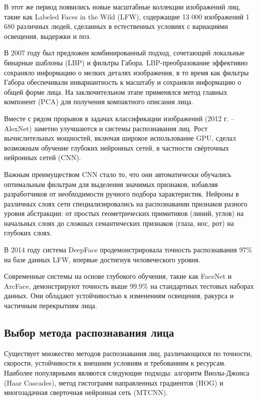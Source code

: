 В этот же период появились новые масштабные коллекции изображений лиц, такие как Labeled Faces in the Wild (LFW), содержащие 13 000 изображений 1 680 различных людей, сделанных в естественных условиях с вариациями освещения, выдержки и поз.

В 2007 году был предложен комбинированный подход, сочетающий локальные бинарные шаблоны (LBP) и фильтры Габора. LBP-преобразование эффективно сохраняло информацию о мелких деталях изображения, в то время как фильтры Габора обеспечивали инвариантность к масштабу и сохраняли информацию о общей форме лица. На заключительном этапе применялся метод главных компонент (PCA) для получения компактного описания лица.

Вместе с рядом прорывов в задачах классификации изображений (2012 г. –  AlexNet) заметно улучшаются и системы распознавания лиц. Рост вычислительных мощностей, включая широкое использование GPU, сделал возможным обучение глубоких нейронных сетей, в частности свёрточных нейронных сетей (CNN).

Важным преимуществом CNN стало то, что они автоматически обучались оптимальным фильтрам для выделения значимых признаков, избавляя разработчиков от необходимости ручного подбора характеристик. Нейроны в различных слоях сети специализировались на распознавании признаков разного уровня абстракции: от простых геометрических примитивов (линий, углов) на начальных слоях до сложных семантических признаков (глаза, нос, рот) на глубоких слоях.

В 2014 году система DeepFace продемонстрировала точность распознавания 97\% на базе данных LFW, впервые достигнув человеческого уровня.

Современные системы на основе глубокого обучения, такие как FaceNet и ArcFace, демонстрируют точность выше 99.9\% на стандартных тестовых наборах данных. Они обладают устойчивостью к изменениям освещения, ракурса и частичным перекрытиям лица.\cite{history}

\subsection{Выбор метода распознавания лица}

Существует множество методов распознавания лиц, различающихся по точности, скорости, устойчивости к внешним условиям и требованиям к ресурсам. Наиболее популярными являются следующие подходы: алгоритм Виолы-Джонса (Haar Cascades), метод гистограмм направленных градиентов (HOG) и многозадачная сверточная нейронная сеть (MTCNN).\cite{four}


